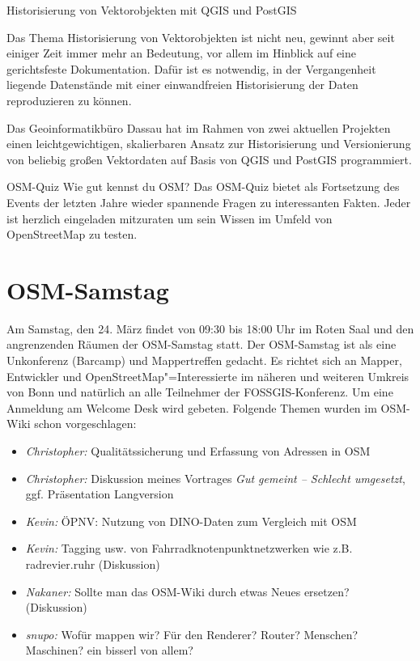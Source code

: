 
%
{Historisierung von Vektorobjekten mit QGIS und PostGIS}%
{}%
{%
Das Thema Historisierung von Vektorobjekten ist nicht neu, gewinnt aber seit
einiger Zeit immer mehr an Bedeutung, vor allem im Hinblick auf eine
gerichtsfeste Dokumentation. Dafür ist es notwendig, in der Vergangenheit
liegende Datenstände mit einer einwandfreien Historisierung der Daten
reproduzieren zu können.

Das Geoinformatikbüro Dassau hat im Rahmen von zwei aktuellen Projekten einen
leichtgewichtigen, skalierbaren Ansatz zur Historisierung und Versionierung von
beliebig großen Vektordaten auf Basis von QGIS und PostGIS programmiert.%
}

%
{OSM-Quiz}%
{Wie gut kennst du OSM?}%
{Das OSM-Quiz bietet als Fortsetzung des Events der letzten Jahre wieder spannende Fragen zu
interessanten Fakten. Jeder ist herzlich eingeladen mitzuraten um sein Wissen im Umfeld von
OpenStreetMap zu testen.}




\newpage
\section*{OSM-Samstag}
\pagestyle{cropmarksstyle}
\label{osm-samstag}
Am Samstag, den 24. März findet von 09:30 bis 18:00 Uhr im Roten Saal und den angrenzenden Räumen der OSM-Samstag statt.
Der OSM-Samstag ist als eine Unkonferenz (Barcamp) und Mappertreffen gedacht.
Es richtet sich an Mapper, Entwickler und OpenStreetMap"=Interessierte im näheren und
weiteren Umkreis von Bonn und natürlich an alle Teilnehmer der FOSSGIS-Konferenz. Um eine Anmeldung am Welcome Desk wird gebeten.
Folgende Themen wurden im OSM-Wiki schon vorgeschlagen:
\begin{itemize}
  \RaggedRight
  \setlength{\itemsep}{-1pt}
  \item \emph{Christopher:} Qualitätssicherung und Erfassung von Adressen in OSM
  \item \emph{Christopher:} Diskussion meines Vortrages \emph{Gut gemeint -- Schlecht umgesetzt}, ggf. Präsentation Langversion
  \item \emph{Kevin:} ÖPNV: Nutzung von DINO-Daten zum Vergleich mit OSM
  \item \emph{Kevin:} Tagging usw. von Fahrradknotenpunktnetzwerken wie z.B. radrevier.ruhr (Diskussion)
  \item \emph{Nakaner:} Sollte man das OSM-Wiki durch etwas Neues ersetzen? (Diskussion)
  \item \emph{snupo:} Wofür mappen wir? Für den Renderer? Router? Menschen? Maschinen? ein bisserl von allem?
\end{itemize}
\vfill
\justifying

\newpage

